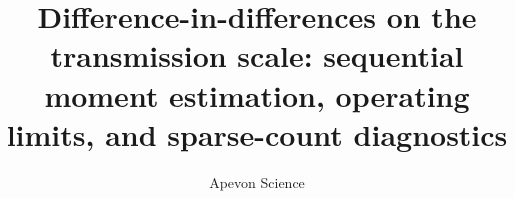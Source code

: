 \documentclass[useAMS,usenatbib,referee]{biom}
\title[DiD on the transmission scale]{Difference-in-differences on the transmission scale: sequential moment estimation, operating limits, and sparse-count diagnostics}
\author{Apevon Science}
\begin{document}

\maketitle
\normalfont\mdseries








\FloatBarrier


\end{document}
